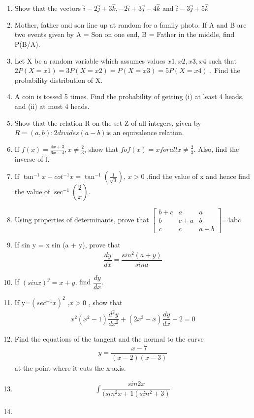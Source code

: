 \documentclass[12pt,-letter paper]{article}
\providecommand{\myvec}[1]{\ensuremath{\begin{bmatrix}#1\end{bmatrix}}}
\begin{document}
\begin{enumerate}
\item Show that the vectors $\hat{i}-2\hat{j}+3\hat{k}$$,-2\hat{i}+3\hat{j}-4\hat{k}$ and $\hat{i}-3\hat{j}+5\hat{k}$
\item Mother, father and son line up at random for a family photo. If A and B are two events given by A = Son on one end, B = Father in the middle, find P(B/A).
\item Let X be a random variable which assumes values $x1, x2, x3, x4$ such that $2P(X = x1) = 3P(X = x2) = P(X = x3) = 5P(X = x4)$ . Find the probability distribution of X.
\item A coin is tossed 5 times. Find the probability of getting (i) at least 4 heads, and (ii) at most 4 heads.
\item Show that the relation R on the set Z of all integers, given by $R = {(a, b):2 divides (a - b)}$is an equivalence relation.
\item If ${f(x) =\frac{4x+3}{6x-4},x \neq \frac{2}{3}} $, show that $fof(x) = x for all x \neq \frac{2}{3}$. Also, find the inverse of f.
\item If $\tan^{-1}x -cot^{-1} {x} =\tan^{-1}\left(\frac{1}{ \sqrt3}\right)$, $x>0$ ,find the value of x and hence find the value of $ \sec^{-1}\left(\dfrac{2}{x}\right)$.
\item Using properties of determinants, prove that \myvec{b+c&a&a\\b&c+a&b\\c&c&a+b}=4abc
\item If sin y = x sin (a + y), prove that 
\begin{align}
    \dfrac{dy}{dx} =\dfrac{sin^{2}(a+y)}{sin a}
\end{align}
\item If $(sin x)^y= x + y$, find $\dfrac{dy}{dx}$.
\item If y=$(sec^{-1}{x})^{2}$ ,$x>0$ , show that 
\begin{align}
    x^2(x^2-1)\dfrac{d^{2}y}{dx^{2}}+(2x^{3}-x)\dfrac{dy}{dx}-2=0
\end{align}
\item Find the equations of the tangent and the normal to the curve 
\begin{align}
y=\dfrac{x-7}{(x-2)(x-3)}    
\end{align}
at the point where it cuts the x-axis.
\item 
\begin{align}
\int\dfrac{sin{2}x}{(sin^{2}x+1(sin^{2}+3)}
\end{align}
\item 
$$
\end{enumerate}
\end{document}

